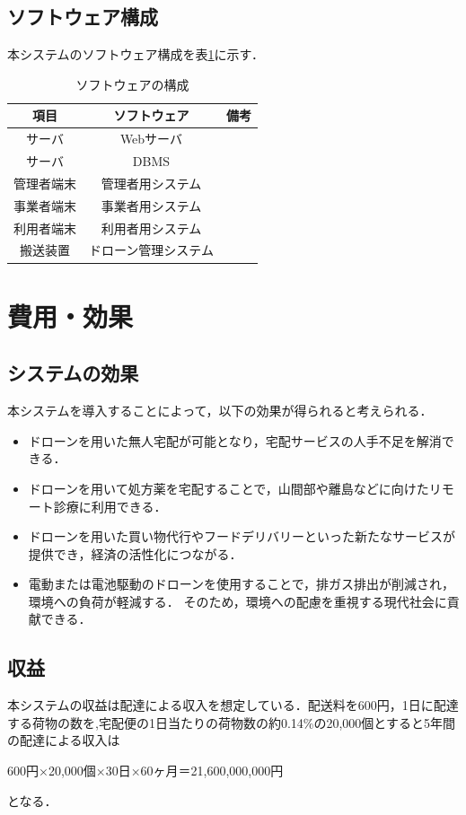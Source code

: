 \documentclass[a4paper, titlepage]{jsarticle}
\begin{document}
\subsection{ソフトウェア構成}
本システムのソフトウェア構成を表\ref{fig:software}に示す．
\begin{table}[H]
  \begin{center}
    \caption{ソフトウェアの構成}
    \label{fig:software}
    \begin{tabular}{ccc} \hline
      項目           & ソフトウェア & 備考     \\ \hline \hline
      サーバ       & Webサーバ  &        \\
      サーバ & DBMS  &        \\
      管理者端末        & 管理者用システム &   \\
      事業者端末        & 事業者用システム &         \\
      利用者端末        & 利用者用システム & \\
      搬送装置         & ドローン管理システム &         \\ \hline
    \end{tabular}
  \end{center}
\end{table}

\section{費用・効果}
\subsection{システムの効果}
本システムを導入することによって，以下の効果が得られると考えられる．
\begin{itemize}
  \item ドローンを用いた無人宅配が可能となり，宅配サービスの人手不足を解消できる．
  \item ドローンを用いて処方薬を宅配することで，山間部や離島などに向けたリモート診療に利用できる．
  \item ドローンを用いた買い物代行やフードデリバリーといった新たなサービスが提供でき，経済の活性化につながる．
  \item 電動または電池駆動のドローンを使用することで，排ガス排出が削減され，環境への負荷が軽減する．
        そのため，環境への配慮を重視する現代社会に貢献できる．
\end{itemize}

\subsection{収益}
本システムの収益は配達による収入を想定している．配送料を600円，1日に配達する荷物の数を,宅配便の1日当たりの荷物数の約0.14\%の20,000個とすると5年間の配達による収入は
\begin{center}
  600円×20,000個×30日×60ヶ月＝21,600,000,000円
\end{center}
となる．
\end{document}
